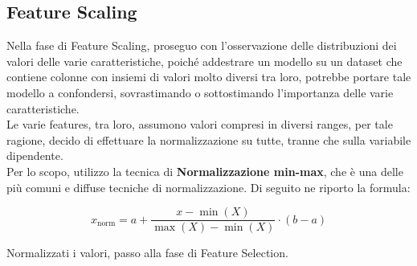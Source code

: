 \documentclass[]{article}
\begin{document}
    \subsection{Feature Scaling}
        Nella fase di Feature Scaling, proseguo con l'osservazione delle distribuzioni dei valori delle varie caratteristiche, poiché addestrare un modello su un dataset che contiene colonne con insiemi di valori molto diversi tra loro, potrebbe portare tale modello a confondersi, sovrastimando o sottostimando l'importanza delle varie caratteristiche.\\
        Le varie features, tra loro, assumono valori compresi in diversi ranges, per tale ragione, decido di effettuare la normalizzazione su tutte, tranne che sulla variabile dipendente.\\
        Per lo scopo, utilizzo la tecnica di \textbf{Normalizzazione min-max}, che è una delle più comuni e diffuse tecniche di normalizzazione.
        Di seguito ne riporto la formula:
        \begin{center}
            \[
                x_{\text{norm}} = a + \frac{{x - \min(X)}}{{\max(X) - \min(X)}} \cdot (b - a)
            \]
        \end{center}
        Normalizzati i valori, passo alla fase di Feature Selection.
\end{document}

